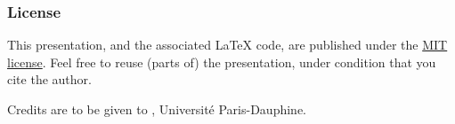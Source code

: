 \documentclass[french, english]{beamer}
\begin{document}
\begin{frame}[allowframebreaks]
	\frametitle{\refname}
 	
\end{frame}

\clearpage{}
\begin{frame}[plain]
	\frametitle{License}
	This presentation, and the associated \LaTeX{} code, are published under the \href{https://opensource.org/licenses/MIT}{MIT license}. Feel free to reuse (parts of) the presentation, under condition that you cite the author.
	
	Credits are to be given to , Université Paris-Dauphine.
\end{frame}
\addtocounter{framenumber}{-1}
\end{document}
